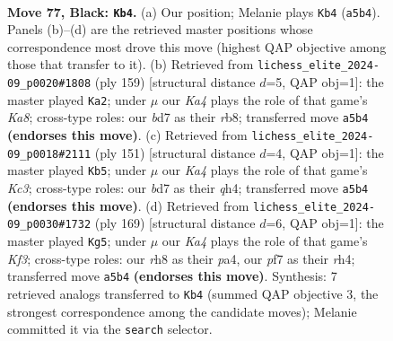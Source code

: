 \documentclass[11pt]{article}
\begin{document}
\clearpage

\begin{figure}[p]\centering
\begin{subfigure}{0.46\textwidth}\centering
\resizebox{\linewidth}{!}{%
\newchessgame
\chessboard[
  setfen={7R/3B1P2/8/k7/8/8/5K1P/8 b - - 8 77},
  showmover=false,
  pgfstyle=straightmove, color=movearrow, markmove={a5-b4}
]}
\caption{}
\end{subfigure}\hfill
\begin{subfigure}{0.46\textwidth}\centering
\resizebox{\linewidth}{!}{%
\newchessgame
\chessboard[
  setfen={1R6/6P1/8/6R1/8/7K/8/k7 b - - 2 80},
  showmover=false,
  pgfstyle=straightmove, color=movearrow, markmove={a1-a2}
]}
\caption{}
\end{subfigure}
\\[4pt]
\begin{subfigure}{0.46\textwidth}\centering
\resizebox{\linewidth}{!}{%
\newchessgame
\chessboard[
  setfen={8/6K1/2k5/8/7Q/1P6/8/1R6 b - - 2 76},
  showmover=false,
  pgfstyle=straightmove, color=movearrow, markmove={c6-b5}
]}
\caption{}
\end{subfigure}\hfill
\begin{subfigure}{0.46\textwidth}\centering
\resizebox{\linewidth}{!}{%
\newchessgame
\chessboard[
  setfen={8/8/5k2/8/P6R/1K6/8/1B6 b - - 16 85},
  showmover=false,
  pgfstyle=straightmove, color=movearrow, markmove={f6-g5}
]}
\caption{}
\end{subfigure}
\caption{\textbf{Move 77, Black: \texttt{Kb4}.} (a) Our position; Melanie plays \texttt{Kb4} (\texttt{a5b4}). Panels (b)--(d) are the retrieved master positions whose correspondence most drove this move (highest QAP objective among those that transfer to it). (b) Retrieved from \texttt{lichess\_elite\_2024-09\_p0020\#1808} (ply 159) [structural distance $d$=5, QAP obj=1]: the master played \texttt{Ka2}; under $\mu$ our \emph{Ka4} plays the role of that game's \emph{Ka8}; cross-type roles: our \emph{b}d7 as their \emph{r}b8; transferred move \texttt{a5b4} \textbf{(endorses this move)}. (c) Retrieved from \texttt{lichess\_elite\_2024-09\_p0018\#2111} (ply 151) [structural distance $d$=4, QAP obj=1]: the master played \texttt{Kb5}; under $\mu$ our \emph{Ka4} plays the role of that game's \emph{Kc3}; cross-type roles: our \emph{b}d7 as their \emph{q}h4; transferred move \texttt{a5b4} \textbf{(endorses this move)}. (d) Retrieved from \texttt{lichess\_elite\_2024-09\_p0030\#1732} (ply 169) [structural distance $d$=6, QAP obj=1]: the master played \texttt{Kg5}; under $\mu$ our \emph{Ka4} plays the role of that game's \emph{Kf3}; cross-type roles: our \emph{r}h8 as their \emph{p}a4, our \emph{p}f7 as their \emph{r}h4; transferred move \texttt{a5b4} \textbf{(endorses this move)}. Synthesis: 7 retrieved analogs transferred to \texttt{Kb4} (summed QAP objective 3, the strongest correspondence among the candidate moves); Melanie committed it via the \texttt{search} selector.}
\label{fig:thought-m153}
\end{figure}
\end{document}
